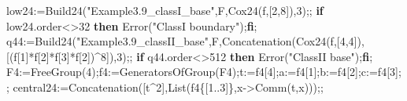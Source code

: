 \documentclass[
  10pt,
  letterpaper,
]{article}
\newenvironment{Shaded}{}{}
\newcommand{\BuiltInTok}[1]{\textcolor[rgb]{0.00,0.50,0.00}{#1}}
\newcommand{\ControlFlowTok}[1]{\textcolor[rgb]{0.00,0.44,0.13}{\textbf{#1}}}
\newcommand{\FloatTok}[1]{\textcolor[rgb]{0.25,0.63,0.44}{#1}}
\newcommand{\NormalTok}[1]{#1}
\newcommand{\OperatorTok}[1]{\textcolor[rgb]{0.40,0.40,0.40}{#1}}
\newcommand{\StringTok}[1]{\textcolor[rgb]{0.25,0.44,0.63}{#1}}
\newcommand{\VariableTok}[1]{\textcolor[rgb]{0.10,0.09,0.49}{#1}}
\begin{document}
\begin{Shaded}
\begin{Highlighting}[]
\VariableTok{low24}\OperatorTok{:=}\VariableTok{Build24}\NormalTok{(}\StringTok{"Example3.9\_classI\_base"}\OperatorTok{,}\VariableTok{F}\OperatorTok{,}\VariableTok{Cox24}\NormalTok{(}\VariableTok{f}\OperatorTok{,}\NormalTok{[}\FloatTok{2}\OperatorTok{,}\FloatTok{8}\NormalTok{])}\OperatorTok{,}\FloatTok{3}\NormalTok{)}\OperatorTok{;;}
\ControlFlowTok{if} \VariableTok{low24}\NormalTok{.}\VariableTok{order}\OperatorTok{\textless{}\textgreater{}}\FloatTok{32} \ControlFlowTok{then} \BuiltInTok{Error}\NormalTok{(}\StringTok{"ClassI boundary"}\NormalTok{)}\OperatorTok{;}\ControlFlowTok{fi}\OperatorTok{;}
\VariableTok{q44}\OperatorTok{:=}\VariableTok{Build24}\NormalTok{(}\StringTok{"Example3.9\_classII\_base"}\OperatorTok{,}\VariableTok{F}\OperatorTok{,}\BuiltInTok{Concatenation}\NormalTok{(}\VariableTok{Cox24}\NormalTok{(}\VariableTok{f}\OperatorTok{,}\NormalTok{[}\FloatTok{4}\OperatorTok{,}\FloatTok{4}\NormalTok{])}\OperatorTok{,}\NormalTok{[(}\VariableTok{f}\NormalTok{[}\FloatTok{1}\NormalTok{]}\OperatorTok{*}\VariableTok{f}\NormalTok{[}\FloatTok{2}\NormalTok{]}\OperatorTok{*}\VariableTok{f}\NormalTok{[}\FloatTok{3}\NormalTok{]}\OperatorTok{*}\VariableTok{f}\NormalTok{[}\FloatTok{2}\NormalTok{])}\OperatorTok{\^{}}\FloatTok{8}\NormalTok{])}\OperatorTok{,}\FloatTok{3}\NormalTok{)}\OperatorTok{;;}
\ControlFlowTok{if} \VariableTok{q44}\NormalTok{.}\VariableTok{order}\OperatorTok{\textless{}\textgreater{}}\FloatTok{512} \ControlFlowTok{then} \BuiltInTok{Error}\NormalTok{(}\StringTok{"ClassII base"}\NormalTok{)}\OperatorTok{;}\ControlFlowTok{fi}\OperatorTok{;}
\VariableTok{F4}\OperatorTok{:=}\BuiltInTok{FreeGroup}\NormalTok{(}\FloatTok{4}\NormalTok{)}\OperatorTok{;}\VariableTok{f4}\OperatorTok{:=}\BuiltInTok{GeneratorsOfGroup}\NormalTok{(}\VariableTok{F4}\NormalTok{)}\OperatorTok{;}\VariableTok{t}\OperatorTok{:=}\VariableTok{f4}\NormalTok{[}\FloatTok{4}\NormalTok{]}\OperatorTok{;}\VariableTok{a}\OperatorTok{:=}\VariableTok{f4}\NormalTok{[}\FloatTok{1}\NormalTok{]}\OperatorTok{;}\VariableTok{b}\OperatorTok{:=}\VariableTok{f4}\NormalTok{[}\FloatTok{2}\NormalTok{]}\OperatorTok{;}\VariableTok{c}\OperatorTok{:=}\VariableTok{f4}\NormalTok{[}\FloatTok{3}\NormalTok{]}\OperatorTok{;;}
\VariableTok{central24}\OperatorTok{:=}\BuiltInTok{Concatenation}\NormalTok{([}\VariableTok{t}\OperatorTok{\^{}}\FloatTok{2}\NormalTok{]}\OperatorTok{,}\BuiltInTok{List}\NormalTok{(}\VariableTok{f4}\NormalTok{\{[}\FloatTok{1}\OperatorTok{..}\FloatTok{3}\NormalTok{]\}}\OperatorTok{,}\VariableTok{x}\OperatorTok{{-}\textgreater{}}\BuiltInTok{Comm}\NormalTok{(}\VariableTok{t}\OperatorTok{,}\VariableTok{x}\NormalTok{)))}\OperatorTok{;;}

\end{Highlighting}
\end{Shaded}
\end{document}
